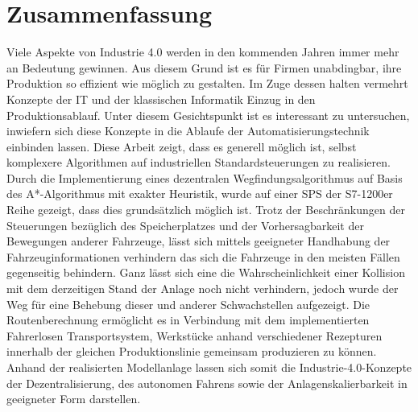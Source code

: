 \section{Zusammenfassung}
	
	Viele Aspekte von Industrie 4.0 werden in den kommenden Jahren immer mehr an Bedeutung gewinnen. Aus diesem Grund ist es für Firmen unabdingbar, ihre Produktion so effizient wie möglich zu gestalten. Im Zuge dessen halten vermehrt Konzepte der IT und der klassischen Informatik Einzug in den Produktionsablauf. Unter diesem Gesichtspunkt ist es interessant zu untersuchen, inwiefern sich diese Konzepte in die Ablaufe der Automatisierungstechnik einbinden lassen. Diese Arbeit zeigt, dass es generell möglich ist, selbst komplexere Algorithmen auf industriellen Standardsteuerungen zu realisieren. Durch die Implementierung eines dezentralen Wegfindungsalgorithmus auf Basis des A*-Algorithmus mit exakter Heuristik, wurde auf einer \ac{SPS} der S7-1200er Reihe gezeigt, dass dies grundsätzlich möglich ist. Trotz der Beschränkungen der Steuerungen bezüglich des Speicherplatzes und der Vorhersagbarkeit der Bewegungen anderer Fahrzeuge, lässt sich mittels geeigneter Handhabung der Fahrzeuginformationen verhindern das sich die Fahrzeuge in den meisten Fällen gegenseitig behindern. Ganz lässt sich eine die Wahrscheinlichkeit einer Kollision mit dem derzeitigen Stand der Anlage noch nicht verhindern, jedoch wurde der Weg für eine Behebung dieser und anderer Schwachstellen aufgezeigt. Die Routenberechnung ermöglicht es in Verbindung mit dem implementierten Fahrerlosen Transportsystem, Werkstücke anhand verschiedener Rezepturen innerhalb der gleichen Produktionslinie gemeinsam produzieren zu können. Anhand der realisierten Modellanlage lassen sich somit die Industrie-4.0-Konzepte der Dezentralisierung, des autonomen Fahrens sowie der Anlagenskalierbarkeit in geeigneter Form darstellen.
	
	